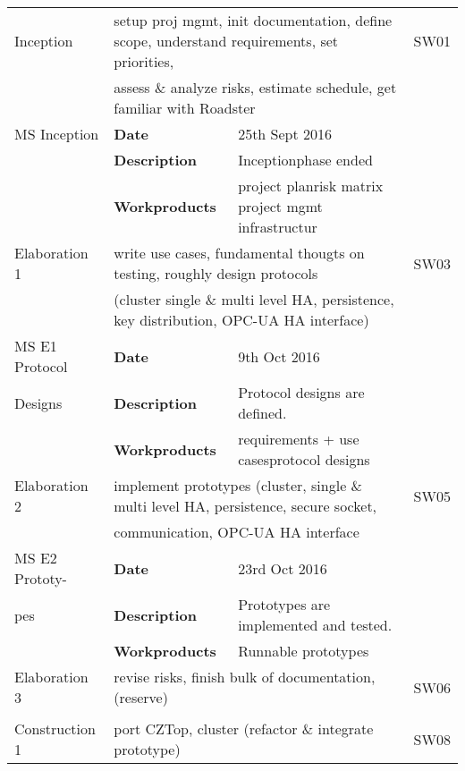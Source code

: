 \begin{center}
\begin{longtable}{|p{2.5cm}|p{5.5cm} p{5.5cm}|p{1.0cm}|}
    \hline
    \endlastfoot
	Inception 		& \multicolumn{2}{|l|}{setup proj mgmt, init documentation, define scope, understand requirements, set priorities,} & SW01	\\
					& \multicolumn{2}{|l|}{assess \& analyze risks, estimate schedule, get familiar with Roadster} 						&		\\ \hline				
	MS Inception 	& \textbf{Date} 					& 25th Sept 2016																& 		\\
					& \textbf{Description}				& Inceptionphase ended															&		\\
					& \textbf{Workproducts}				& project plan\newline risk matrix \newline project mgmt infrastructur	 		&		\\ \hline
	Elaboration 1	& \multicolumn{2}{|l|}{write use cases, fundamental thougts on testing, roughly design protocols} 					& SW03	\\
					& \multicolumn{2}{|l|}{(cluster single \& multi level HA, persistence, key distribution, OPC-UA HA interface)} 		&		\\ \hline				
	MS E1 Protocol 	& \textbf{Date} 					& 9th Oct 2016																	& 		\\
	Designs			& \textbf{Description}				& Protocol designs are defined.													&		\\
					& \textbf{Workproducts}				& requirements + use cases\newline protocol designs 							&		\\ \hline
	Elaboration 2	& \multicolumn{2}{|l|}{implement prototypes (cluster, single \& multi level HA, persistence, secure socket, } 		& SW05	\\
					& \multicolumn{2}{|l|}{communication, OPC-UA HA interface}								 							&		\\ \hline
	MS E2 Prototy-	& \textbf{Date} 					& 23rd Oct 2016																	& 		\\
	pes				& \textbf{Description}				& Prototypes are implemented and tested.										&		\\
					& \textbf{Workproducts}				& Runnable prototypes													 		&		\\ \hline
	Elaboration 3	& \multicolumn{2}{|l|}{revise risks, finish bulk of documentation, (reserve)}				 						& SW06	\\
					& \multicolumn{2}{|l|}{}											 												&		\\ \hline
	Construction 1	& \multicolumn{2}{|l|}{port CZTop, cluster (refactor \& integrate prototype)}				 						& SW08	\\

\end{longtable}
\end{center}

